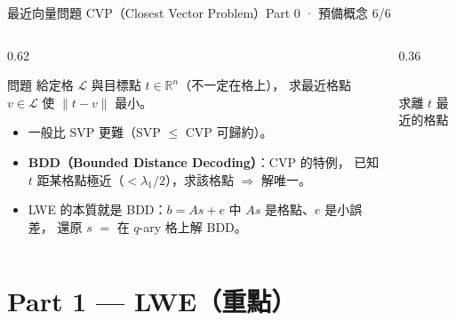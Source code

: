 \documentclass[aspectratio=169, 11pt]{beamer}
\newcommand{\R}{\mathbb{R}}
\begin{document}
\begin{frame}{最近向量問題 CVP（Closest Vector Problem）}{Part 0 · 預備概念 6/6}
  \begin{columns}[T]
    \begin{column}{0.62\textwidth}
      \begin{block}{問題}
        給定格 $\mathcal{L}$ 與目標點 $t\in\R^n$（不一定在格上），
        求最近格點 $v\in\mathcal{L}$ 使 $\|t-v\|$ 最小。
      \end{block}
      \begin{itemize}\small
        \item 一般比 SVP 更難（SVP $\le$ CVP 可歸約）。
        \item \textbf{BDD（Bounded Distance Decoding）}：CVP 的特例，
          已知 $t$ 距某格點極近（$<\lambda_1/2$），求該格點 $\Rightarrow$ 解唯一。
        \item \alert{LWE 的本質就是 BDD}：$b=As+e$ 中 $As$ 是格點、$e$ 是小誤差，
          還原 $s$ $=$ 在 $q$-ary 格上解 BDD。
      \end{itemize}
    \end{column}
    \begin{column}{0.36\textwidth}
      \centering
      \\[2pt]{\scriptsize 求離 $t$ 最近的格點}
    \end{column}
  \end{columns}
\end{frame}

\section{Part 1 — LWE（重點）}
\end{document}
